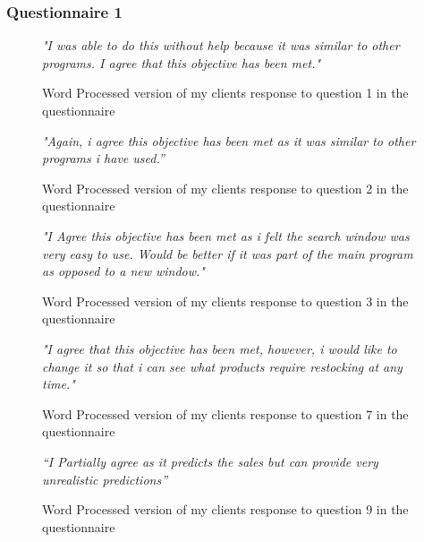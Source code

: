 \subsubsection{Questionnaire 1}


\begin{figure}[H]
\caption{Word Processed version of my clients response to question 1 in the questionnaire} \label{client-evidence-Q1}
\vspace{3mm}
\textit{\large{"I was able to do this without help because it was similar to other programs. I agree that this objective has been met."}}
\vspace{3mm}
\end{figure}

\begin{figure}[H]
\caption{Word Processed version of my clients response to question 2 in the questionnaire}
\vspace{3mm}
\textit{\large{"Again, i agree this objective has been met as it was similar to other programs i have used.''}}
\vspace{3mm}
\end{figure}

\begin{figure}[H]
\caption{Word Processed version of my clients response to question 3 in the questionnaire} \label{client-evidence-Q3}
\vspace{3mm}
\textit{\large{"I Agree this objective has been met as i felt the search window was very easy to use. Would be better if it was part of the main program as opposed to a new window."}}
\vspace{3mm}
\end{figure}

\begin{figure}[H]
\caption{Word Processed version of my clients response to question 7 in the questionnaire}
\vspace{3mm}
\textit{\large{"I agree that this objective has been met, however, i would like to change it so that i can see what products require restocking at any time."}}
\vspace{3mm}
\end{figure}

\begin{figure}[H]
\caption{Word Processed version of my clients response to question 9 in the questionnaire} \label{client-evidence-Q1}
\vspace{3mm}
\textit{\large{``I Partially agree as it predicts the sales but can provide very unrealistic predictions''}}
\vspace{3mm}
\end{figure}

